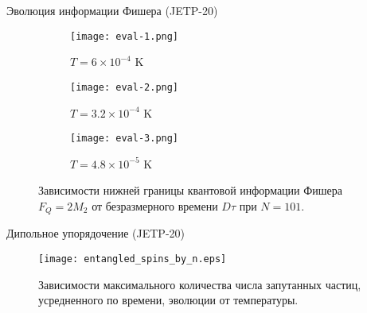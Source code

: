 

\begin{frame}{Эволюция информации Фишера (JETP-20)}
  \begin{figure}
    \begin{subfigure}[t]{0.3\textwidth}
    \texttt{[image: eval-1.png]}
    \caption{$T = 6 \times 10^{-4}$ K}
    \end{subfigure}
    \hfill
    \begin{subfigure}[t]{0.3\textwidth}
      \texttt{[image: eval-2.png]}
      \caption{$T = 3.2 \times 10^{-4}$ K}
    \end{subfigure}
    \hfill
    \begin{subfigure}[t]{0.3\textwidth}
      \texttt{[image: eval-3.png]}
      \caption{$T = 4.8 \times 10^{-5}$ K}
    \end{subfigure}
    \caption{Зависимости нижней границы квантовой информации Фишера $F_Q = 2M_2$ от безразмерного времени $D\tau$ при $N = 101$.}
  \end{figure}
\end{frame}

\begin{frame}{Дипольное упорядочение (JETP-20)}
    \begin{figure}
    \texttt{[image: entangled\_spins\_by\_n.eps]}
    \caption{Зависимости максимального количества числа запутанных частиц, усредненного по времени, эволюции от температуры.}
    \end{figure}
\end{frame}
